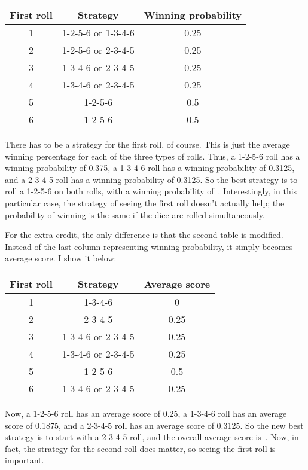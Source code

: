 \documentclass{article}
\begin{document}
\vspace{0.1in}
\begin{center}
\begin{tabular}{c|c|c}
\multicolumn{1}{c}{First roll} & \multicolumn{1}{c}{Strategy} & \multicolumn{1}{c}{Winning probability} \\
\hline
1 & 1-2-5-6 or 1-3-4-6 & 0.25 \\
2 & 1-2-5-6 or 2-3-4-5 & 0.25 \\
3 & 1-3-4-6 or 2-3-4-5 & 0.25 \\
4 & 1-3-4-6 or 2-3-4-5 & 0.25 \\
5 & 1-2-5-6            & 0.5 \\
6 & 1-2-5-6            & 0.5 \\
\end{tabular}
\end{center}
\vspace{0.1in}

There has to be a strategy for the first roll, of course.
This is just the average winning percentage for each of the three types of rolls.
Thus, a 1-2-5-6 roll has a winning probability of 0.375, a 1-3-4-6 roll has a winning probability of 0.3125, and a 2-3-4-5 roll has a winning probability of 0.3125.
So the best strategy is to roll a 1-2-5-6 on both rolls, with a winning probability of
\,.
Interestingly, in this particular case, the strategy of seeing the first roll doesn't actually help; the probability of winning is the same if the dice are rolled simultaneously.

For the extra credit, the only difference is that the second table is modified.
Instead of the last column representing winning probability, it simply becomes average score.
I show it below:

\vspace{0.1in}
\begin{center}
\begin{tabular}{c|c|c}
\multicolumn{1}{c}{First roll} & \multicolumn{1}{c}{Strategy} & \multicolumn{1}{c}{Average score} \\
\hline
1 & 1-3-4-6            & 0 \\
2 & 2-3-4-5            & 0.25 \\
3 & 1-3-4-6 or 2-3-4-5 & 0.25 \\
4 & 1-3-4-6 or 2-3-4-5 & 0.25 \\
5 & 1-2-5-6            & 0.5 \\
6 & 1-3-4-6 or 2-3-4-5 & 0.25 \\
\end{tabular}
\end{center}
\vspace{0.1in}

Now, a 1-2-5-6 roll has an average score of 0.25, a 1-3-4-6 roll has an average score of 0.1875, and a 2-3-4-5 roll has an average score of 0.3125.
So the new best strategy is to start with a 2-3-4-5 roll, and the overall average score is
\,.
Now, in fact, the strategy for the second roll does matter, so seeing the first roll is important.
\end{document}
